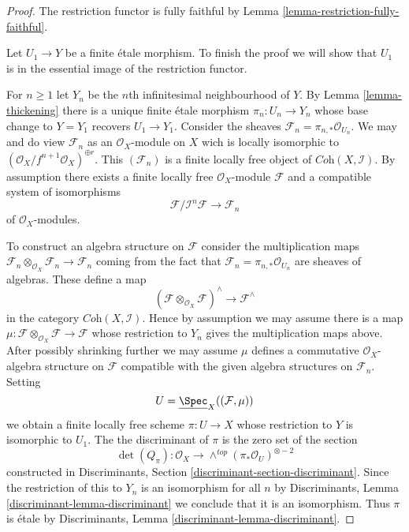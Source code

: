 \begin{proof}
The restriction functor is fully faithful by
Lemma \ref{lemma-restriction-fully-faithful}.

\medskip\noindent
Let $U_1 \to Y$ be a finite \'etale morphism. To finish the proof
we will show that $U_1$ is in the essential image of the
restriction functor.

\medskip\noindent
For $n \geq 1$ let $Y_n$ be the $n$th infinitesimal neighbourhood of $Y$.
By Lemma \ref{lemma-thickening}
there is a unique finite \'etale morphism
$\pi_n : U_n \to Y_n$ whose base change to $Y = Y_1$
recovers $U_1 \to Y_1$.
Consider the sheaves $\mathcal{F}_n = \pi_{n, *}\mathcal{O}_{U_n}$.
We may and do view $\mathcal{F}_n$ as an $\mathcal{O}_X$-module on $X$
wich is locally isomorphic to
$(\mathcal{O}_X/f^{n + 1}\mathcal{O}_X)^{\oplus r}$.
This $(\mathcal{F}_n)$ is a finite locally free object of
$\textit{Coh}(X, \mathcal{I})$.
By assumption there exists a finite locally free $\mathcal{O}_X$-module
$\mathcal{F}$ and a compatible system of isomorphisms
$$
\mathcal{F}/\mathcal{I}^n\mathcal{F} \to \mathcal{F}_n
$$
of $\mathcal{O}_X$-modules.

\medskip\noindent
To construct an algebra structure on $\mathcal{F}$ consider the multiplication
maps
$\mathcal{F}_n \otimes_{\mathcal{O}_X} \mathcal{F}_n \to \mathcal{F}_n$
coming from the fact that $\mathcal{F}_n = \pi_{n, *}\mathcal{O}_{U_n}$
are sheaves of algebras. These define a map
$$
(\mathcal{F}\otimes_{\mathcal{O}_X} \mathcal{F})^\wedge
\longrightarrow
\mathcal{F}^\wedge
$$
in the category $\textit{Coh}(X, \mathcal{I})$. Hence by assumption
we may assume there is a map
$\mu : \mathcal{F}\otimes_{\mathcal{O}_X} \mathcal{F} \to \mathcal{F}$
whose restriction to $Y_n$ gives the multiplication maps above.
After possibly shrinking further we may assume $\mu$
defines a commutative $\mathcal{O}_X$-algebra
structure on $\mathcal{F}$ compatible with the given algebra
structures on $\mathcal{F}_n$.
Setting
$$
U = \underline{\Spec}_X((\mathcal{F}, \mu))
$$
we obtain a finite locally free scheme $\pi : U \to X$ whose restriction
to $Y$ is isomorphic to $U_1$. The the discriminant of $\pi$ is the zero
set of the section
$$
\det(Q_\pi) :
\mathcal{O}_X
\longrightarrow
\wedge^{top}(\pi_*\mathcal{O}_U)^{\otimes -2}
$$
constructed in
Discriminants, Section \ref{discriminant-section-discriminant}.
Since the restriction of this to $Y_n$ is an isomorphism for all $n$
by Discriminants, Lemma \ref{discriminant-lemma-discriminant}
we conclude that it is an isomorphism. Thus $\pi$ is \'etale by
Discriminants, Lemma \ref{discriminant-lemma-discriminant}.
\end{proof}


